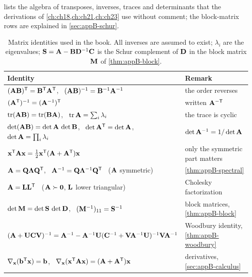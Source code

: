  lists the algebra of transposes, inverses, traces
and determinants that the derivations of \cref{ch:ch18,ch:ch21,ch:ch23} use
without comment; the block-matrix rows are explained in
\cref{sec:appB-schur}.

\begin{table}[tb]
  \centering\small
  \caption{Matrix identities used in the book. All inverses are assumed to exist; $\lambda_i$ are the eigenvalues; $\mat{S} = \mat{A} - \mat{B}\mat{D}\inv\mat{C}$ is the Schur complement of $\mat{D}$ in the block matrix $\mat{M}$ of \cref{thm:appB-block}.}
  \label{tab:appB-identities}
  \begin{tabular}{@{}L{8.9cm}L{5.9cm}@{}}
  \toprule
  Identity & Remark\\
  \midrule
  $(\mathbf{A}\mathbf{B})^{\mathsf{T}} = \mathbf{B}^{\mathsf{T}}\mathbf{A}^{\mathsf{T}}$, \ $(\mathbf{A}\mathbf{B})^{-1} = \mathbf{B}^{-1}\mathbf{A}^{-1}$ & the order reverses\\
  $(\mathbf{A}^{\mathsf{T}})^{-1} = (\mathbf{A}^{-1})^{\mathsf{T}}$ & written $\mathbf{A}^{-\mathsf{T}}$\\
  $\operatorname{tr}(\mathbf{A}\mathbf{B}) = \operatorname{tr}(\mathbf{B}\mathbf{A})$, \ $\operatorname{tr} \mathbf{A} = \sum_i \lambda_i$ & the trace is cyclic\\
  $\det(\mathbf{A}\mathbf{B}) = \det\mathbf{A}\,\det\mathbf{B}$, \ $\det\mathbf{A}^{\mathsf{T}} = \det\mathbf{A}$, \ $\det\mathbf{A} = \prod_i \lambda_i$ & $\det \mathbf{A}^{-1} = 1/\det \mathbf{A}$\\
  $\mathbf{x}^{\mathsf{T}}\mathbf{A}\mathbf{x} = \tfrac12\mathbf{x}^{\mathsf{T}}(\mathbf{A} + \mathbf{A}^{\mathsf{T}})\mathbf{x}$ & only the symmetric part matters\\
  $\mathbf{A} = \mathbf{Q}\mathbf{\Lambda}\mathbf{Q}^{\mathsf{T}}$, \ $\mathbf{A}^{-1} = \mathbf{Q}\mathbf{\Lambda}^{-1}\mathbf{Q}^{\mathsf{T}}$ \ ($\mathbf{A}$ symmetric) & \cref{thm:appB-spectral}\\
  $\mathbf{A} = \mathbf{L}\mathbf{L}^{\mathsf{T}}$ \ ($\mathbf{A} \succ \mathbf{0}$, $\mathbf{L}$ lower triangular) & Cholesky factorization\\
  $\det\mathbf{M} = \det\mathbf{S}\,\det\mathbf{D}$, \ $(\mathbf{M}^{-1})_{11} = \mathbf{S}^{-1}$ & block matrices, \cref{thm:appB-block}\\
  $(\mathbf{A} + \mathbf{U}\mathbf{C}\mathbf{V})^{-1} = \mathbf{A}^{-1} - \mathbf{A}^{-1}\mathbf{U}(\mathbf{C}^{-1} + \mathbf{V}\mathbf{A}^{-1}\mathbf{U})^{-1}\mathbf{V}\mathbf{A}^{-1}$ & Woodbury identity, \cref{thm:appB-woodbury}\\
  $\nabla_{\mathbf{x}}(\mathbf{b}^{\mathsf{T}}\mathbf{x}) = \mathbf{b}$, \ $\nabla_{\mathbf{x}}(\mathbf{x}^{\mathsf{T}}\mathbf{A}\mathbf{x}) = (\mathbf{A} + \mathbf{A}^{\mathsf{T}})\mathbf{x}$ & derivatives, \cref{sec:appB-calculus}\\
  \bottomrule
  \end{tabular}
\end{table}


